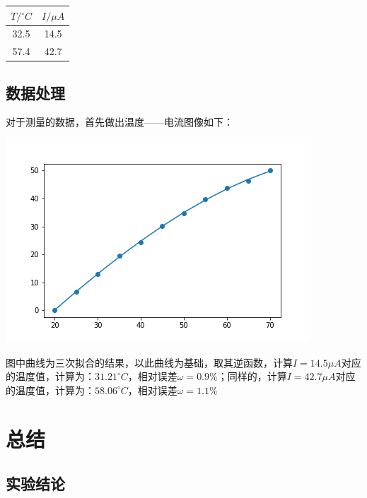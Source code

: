 \documentclass[a4paper]{ltxdoc}
\newenvironment{Figure}
{\par\medskip\noindent\minipage{\linewidth}}
{\endminipage\par\medskip}
\begin{document}
\begin{multicols}{2}
    \begin{Figure}
        \centering
        \begin{tabular}{|c|c|}
            \hline
            \textbf{$T/{}^{\circ}C$} & \textbf{$I/\mu A$} \\\hline
            32.5                     & 14.5               \\\hline
            57.4                     & 42.7               \\\hline
        \end{tabular}
    \end{Figure}

    \subsection{数据处理}

    对于测量的数据，首先做出温度——电流图像如下：
    \begin{Figure}
        \centering
        \includegraphics[scale = 0.3]{img/1.png}
    \end{Figure}

    图中曲线为三次拟合的结果，以此曲线为基础，取其逆函数，计算$I = 14.5\mu A$对应的温度值，计算为：$31.21^{\circ}C$，相对误差$\omega = 0.9\%$；同样的，计算$I = 42.7\mu A$对应的温度值，计算为：$58.06^{\circ}C$，相对误差$\omega = 1.1\%$

    \section{总结}

    \subsection{实验结论}


\end{multicols}
\end{document}
